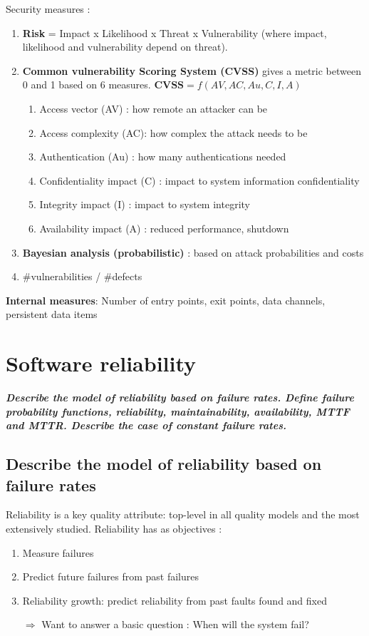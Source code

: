 \documentclass{article}
\begin{document}
\noindent Security measures :
\begin{enumerate}
    \item \textbf{Risk} = Impact x Likelihood x Threat x Vulnerability (where impact, likelihood and vulnerability depend on threat).
    \item \textbf{Common vulnerability Scoring System (CVSS)} gives a metric between 0 and 1 based on 6 measures. $\textbf{CVSS} = f(AV, AC, Au, C, I, A)$
    \begin{enumerate}
        \item Access vector (AV) : how remote an attacker can be
        \item Access complexity (AC): how complex the attack needs to be
        \item Authentication (Au) : how many authentications needed
        \item Confidentiality impact (C) : impact to system information confidentiality
        \item Integrity impact (I) : impact to system integrity
        \item Availability impact (A) : reduced performance, shutdown
    \end{enumerate}
    \item \textbf{Bayesian analysis (probabilistic)} : based on attack probabilities and costs
    \item \#vulnerabilities / \#defects\\
\end{enumerate}

\noindent \textbf{Internal measures}: Number of entry points, exit points, data channels, persistent data items

\newpage
\section{Software reliability}
\textbf{\textit{Describe the model of reliability based on failure rates. Define failure probability functions, reliability, maintainability, availability, MTTF and MTTR. Describe the case of constant failure rates.}}

\subsection{Describe the model of reliability based on failure rates}

Reliability is a key quality attribute: top-level in all quality models and the most extensively studied.
Reliability has as objectives :
\begin{enumerate}
    \item Measure failures
    \item Predict future failures from past failures
    \item Reliability growth: predict reliability from past faults found and fixed
    \item[$\Rightarrow$]Want to answer a basic question : When will the system fail?
\end{enumerate}
\end{document}

